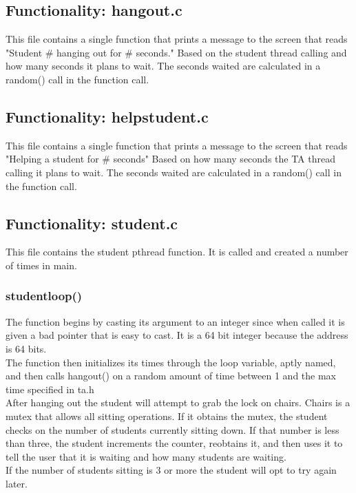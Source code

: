 \documentclass[11pt]{article}
\begin{document}
\subsection{Functionality: hangout.c}
This file contains a single function that prints a message to the screen that reads "Student \# hanging out for \# seconds." Based on the student thread calling and how many seconds it plans to wait. The seconds waited are calculated in a random() call in the function call.

\subsection{Functionality: help\textunderscore student.c}
This file contains a single function that prints a message to the screen that reads "Helping a student for \# seconds" Based on how many seconds the TA thread calling it  plans to wait. The seconds waited are calculated in a random() call in the function call.

\subsection{Functionality: student.c}
This file contains the student pthread function. It is called and created a number of times in main.

\subsubsection{ student\textunderscore loop()}
The function begins by casting its argument to an integer since when called it is given a bad pointer that is easy to cast. It is a 64 bit integer because the address is 64 bits.\\

The function then initializes its times through the loop variable, aptly named, and then calls hang\textunderscore out() on a random amount of time between 1 and the max time specified in ta.h\\

After hanging out the student will attempt to grab the lock on chairs. Chairs is a mutex that allows all sitting operations. If it obtains the mutex, the student checks on the number of students currently sitting down. If that number is less than three, the student increments the counter, reobtains it, and then uses it to tell the user that it is waiting and how many students are waiting.\\

If the number of students sitting is 3 or more the student will opt to try again later.\\
\end{document}
